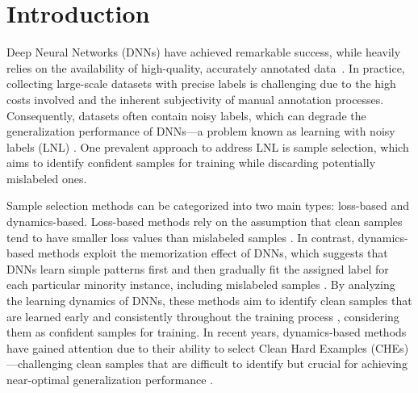 \section{Introduction}
Deep Neural Networks (DNNs) have achieved remarkable success, while heavily relies on the availability of high-quality, accurately annotated data~\cite{han2020survey}. In practice, collecting large-scale datasets with precise labels is challenging due to the high costs involved and the inherent subjectivity of manual annotation processes. Consequently, datasets often contain noisy labels, which can degrade the generalization performance of DNNs—a problem known as learning with noisy labels (LNL) \cite{natarajan2013learning}.
One prevalent approach to address LNL is sample selection, which aims to identify confident samples for training while discarding potentially mislabeled ones. 

Sample selection methods can be categorized into two main types: loss-based and dynamics-based. Loss-based methods rely on the assumption that clean samples tend to have smaller loss values than mislabeled samples \cite{han2018co, liu2020early,xia2021sample, li2024regroup}. In contrast, dynamics-based methods exploit the memorization effect of DNNs, which suggests that DNNs learn simple patterns first and then gradually fit the assigned label for each particular minority instance, including mislabeled samples \cite{liu2020early, zhang2021understanding, yuan2024early}. By analyzing the learning dynamics of DNNs, these methods aim to identify clean samples that are learned early and consistently throughout the training process \cite{yu2019does, xia2020robust, bai2021me, wei2022self}, considering them as confident samples for training.
In recent years, dynamics-based methods have gained attention due to their ability to select Clean Hard Examples (CHEs)—challenging clean samples that are difficult to identify but crucial for achieving near-optimal generalization performance \cite{feldman2020neural, bai2021me, wei2022self, yuan2023late}.


